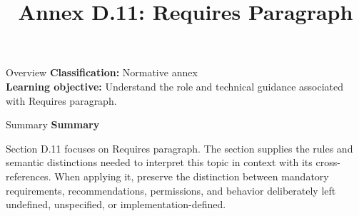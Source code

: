 \documentclass[10pt,letterpaper]{article}
\title{Annex D.11: Requires Paragraph}
\author{}
\date{}
\begin{document}
\maketitle
\begin{CornellOverviewBox}{Overview}
\textbf{Classification:} Normative annex\\[2pt]
\textbf{Learning objective:} Understand the role and technical guidance associated with Requires paragraph.
\end{CornellOverviewBox}\begin{CornellSummaryBox}{Summary}
{\sffamily\bfseries\color{Accent} Summary}\par\vspace{3pt}Section D.11 focuses on Requires paragraph. The section supplies the rules and semantic distinctions needed to interpret this topic in context with its cross-references. When applying it, preserve the distinction between mandatory requirements, recommendations, permissions, and behavior deliberately left undefined, unspecified, or implementation-defined.
\end{CornellSummaryBox}
\end{document}
